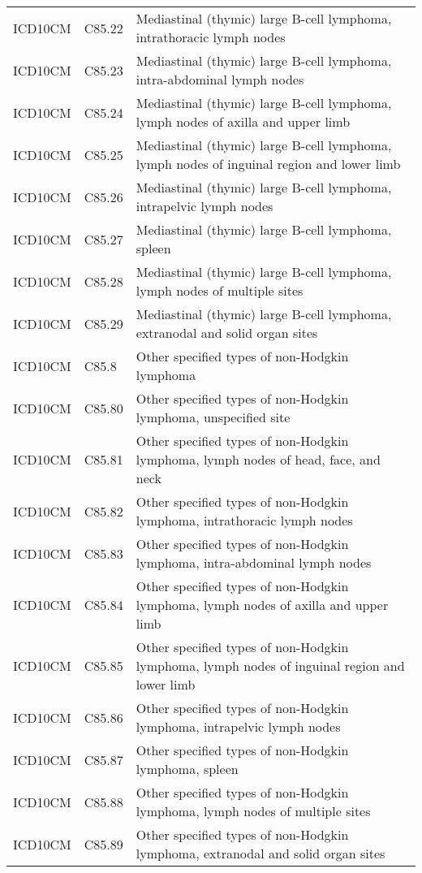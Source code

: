 \begin{longtable}{p{}p{}p{}}
  ICD10CM & C85.22 & Mediastinal (thymic) large B-cell lymphoma, intrathoracic lymph nodes \\ 
  ICD10CM & C85.23 & Mediastinal (thymic) large B-cell lymphoma, intra-abdominal lymph nodes \\ 
  ICD10CM & C85.24 & Mediastinal (thymic) large B-cell lymphoma, lymph nodes of axilla and upper limb \\ 
  ICD10CM & C85.25 & Mediastinal (thymic) large B-cell lymphoma, lymph nodes of inguinal region and lower limb \\ 
  ICD10CM & C85.26 & Mediastinal (thymic) large B-cell lymphoma, intrapelvic lymph nodes \\ 
  ICD10CM & C85.27 & Mediastinal (thymic) large B-cell lymphoma, spleen \\ 
  ICD10CM & C85.28 & Mediastinal (thymic) large B-cell lymphoma, lymph nodes of multiple sites \\ 
  ICD10CM & C85.29 & Mediastinal (thymic) large B-cell lymphoma, extranodal and solid organ sites \\ 
  ICD10CM & C85.8 & Other specified types of non-Hodgkin lymphoma \\ 
  ICD10CM & C85.80 & Other specified types of non-Hodgkin lymphoma, unspecified site \\ 
  ICD10CM & C85.81 & Other specified types of non-Hodgkin lymphoma, lymph nodes of head, face, and neck \\ 
  ICD10CM & C85.82 & Other specified types of non-Hodgkin lymphoma, intrathoracic lymph nodes \\ 
  ICD10CM & C85.83 & Other specified types of non-Hodgkin lymphoma, intra-abdominal lymph nodes \\ 
  ICD10CM & C85.84 & Other specified types of non-Hodgkin lymphoma, lymph nodes of axilla and upper limb \\ 
  ICD10CM & C85.85 & Other specified types of non-Hodgkin lymphoma, lymph nodes of inguinal region and lower limb \\ 
  ICD10CM & C85.86 & Other specified types of non-Hodgkin lymphoma, intrapelvic lymph nodes \\ 
  ICD10CM & C85.87 & Other specified types of non-Hodgkin lymphoma, spleen \\ 
  ICD10CM & C85.88 & Other specified types of non-Hodgkin lymphoma, lymph nodes of multiple sites \\ 
  ICD10CM & C85.89 & Other specified types of non-Hodgkin lymphoma, extranodal and solid organ sites \\ 

\end{longtable}
